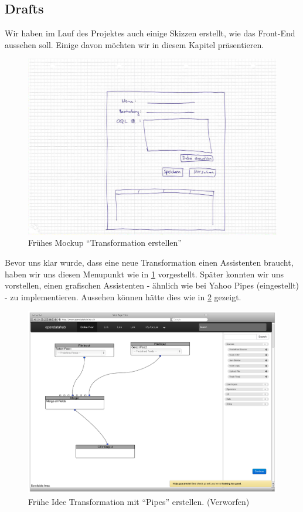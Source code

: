 \subsection{Drafts}
Wir haben im Lauf des Projektes auch einige Skizzen erstellt, wie das Front-End aussehen soll. Einige davon möchten wir in diesem Kapitel präsentieren.
\begin{figure}[H]
    
    \includegraphics[width=0.8\linewidth]{fig/mockup_hcdi}
    \caption{Frühes Mockup ``Transformation erstellen''}
    \label{fig:pd:mockup-upload}
\end{figure}
Bevor uns klar wurde, dass eine neue Transformation einen Assistenten braucht, haben wir uns diesen Menupunkt wie in \cref{fig:pd:mockup-upload} vorgestellt. Später konnten wir uns vorstellen, einen grafischen Assistenten - ähnlich wie bei Yahoo Pipes (eingestellt) - zu implementieren. Aussehen können hätte dies wie in \cref{fig:pd:connectors} gezeigt.
\begin{figure}[H]
    \centering
    \includegraphics[width=0.8\linewidth]{fig/Wireframes-Connectors}
    \caption{Frühe Idee Transformation mit ``Pipes'' erstellen. (Verworfen)}
    \label{fig:pd:connectors}
\end{figure}
